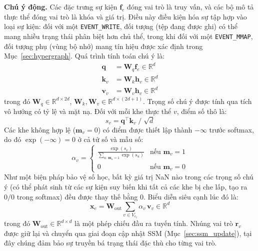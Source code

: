 \documentclass[letterpaper,twocolumn,10pt]{article}
\begin{document}
\textbf{Chú ý động.} Các đặc trưng sự kiện $\mathbf{f}_e$ đóng vai trò là truy vấn, và các bộ mô tả thực thể đóng vai trò là khóa và giá trị. Điều này điều kiện hóa sự tập hợp vào loại sự kiện: đối với một \texttt{EVENT\_WRITE}, đối tượng (tệp đang được ghi) có thể mang nhiều trạng thái phân biệt hơn chủ thể, trong khi đối với một \texttt{EVENT\_MMAP}, đối tượng phụ (vùng bộ nhớ) mang tín hiệu được xác định trong Mục~\ref{sec:hypergraph}. Quá trình tính toán chú ý là:
\begin{align}
    \mathbf{q} &= \mathbf{W}_q \mathbf{f}_e \in \mathbb{R}^{d} \label{eq:agg_q} \\
    \mathbf{k}_v &= \mathbf{W}_k \mathbf{h}_v \in \mathbb{R}^{d} \label{eq:agg_k} \\
    \mathbf{v}_v &= \mathbf{W}_v \mathbf{h}_v \in \mathbb{R}^{d} \label{eq:agg_v}
\end{align}
trong đó $\mathbf{W}_q \in \mathbb{R}^{d \times 2d}$, $\mathbf{W}_k, \mathbf{W}_v \in \mathbb{R}^{d \times (2d+1)}$. Trọng số chú ý được tính qua tích vô hướng có tỷ lệ và mặt nạ. Đối với mỗi khe thực thể $v$, điểm số thô là:
\begin{equation}
    s_v = \mathbf{q}^\top \mathbf{k}_v \;/\; \sqrt{d}
    \label{eq:raw_score}
\end{equation}
Các khe không hợp lệ ($\mathbf{m}_v = 0$) có điểm được thiết lập thành $-\infty$ trước softmax, do đó $\exp(-\infty) = 0$ ở cả tử số và mẫu số:
\begin{equation}
    \alpha_v = 
    \begin{cases}
        \displaystyle\frac{\exp(s_v)}{\sum_{u:\,\mathbf{m}_u = 1} \exp(s_u)} & \text{nếu } \mathbf{m}_v = 1 \\[6pt]
        0 & \text{nếu } \mathbf{m}_v = 0
    \end{cases}
    \label{eq:attn_weights}
\end{equation}
Như một biện pháp bảo vệ số học, bất kỳ giá trị NaN nào trong các trọng số chú ý (có thể phát sinh từ các sự kiện suy biến khi tất cả các khe bị che lấp, tạo ra $0/0$ trong softmax) đều được thay thế bằng 0. Biểu diễn siêu cạnh lúc đó là:
\begin{equation}
    \mathbf{x}_e = \mathbf{W}_{\text{out}} \sum_{v \in V_{e_t}} \alpha_v \, \mathbf{v}_v \in \mathbb{R}^d
    \label{eq:x_e}
\end{equation}
trong đó $\mathbf{W}_{\text{out}} \in \mathbb{R}^{d \times d}$ là một phép chiếu đầu ra tuyến tính. Nhúng vai trò $\mathbf{r}_v$ được giữ lại và chuyển qua giai đoạn cập nhật SSM (Mục~\ref{sec:ssm_update}), tại đây chúng đảm bảo sự truyền bá trạng thái đặc thù cho từng vai trò.
\end{document}
